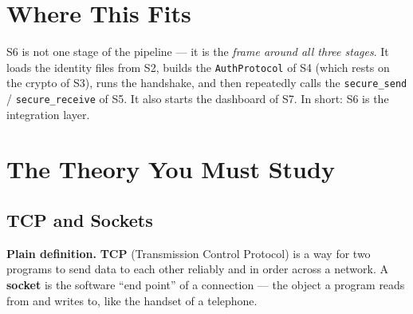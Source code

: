 \documentclass[11pt,a4paper]{article}
\begin{document}
\section{Where This Fits}

S6 is not one stage of the pipeline --- it is the \emph{frame around all three
stages}. It loads the identity files from S2, builds the \texttt{AuthProtocol}
of S4 (which rests on the crypto of S3), runs the handshake, and then repeatedly
calls the \texttt{secure\_send} / \texttt{secure\_receive} of S5. It also starts
the dashboard of S7. In short: S6 is the integration layer.

\begin{center}
\end{center}

\section{The Theory You Must Study}

\subsection{TCP and Sockets}
\textbf{Plain definition.} \textbf{TCP} (Transmission Control Protocol) is a way
for two programs to send data to each other reliably and in order across a
network. A \textbf{socket} is the software ``end point'' of a connection --- the
object a program reads from and writes to, like the handset of a telephone.
\end{document}
